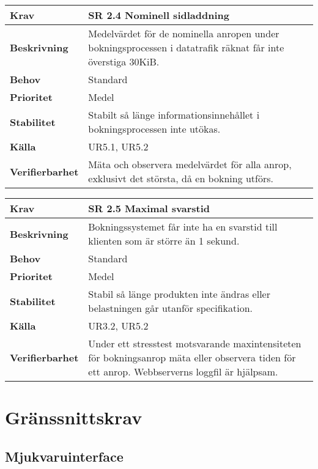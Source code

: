 \documentclass[a4paper, twoside, 11pt, titlepage]{article}
\begin{document}
\begin{tabular} { p{2.6cm} p{12.5cm} }
	\hline
	\sffamily\textbf{Krav} & \sffamily\textbf{SR 2.4 Nominell sidladdning } \\
	\hline
	\sffamily\textbf{Beskrivning} & Medelvärdet för de nominella anropen under bokningsprocessen i datatrafik räknat får inte överstiga 30KiB.  \\
	\hline
	\sffamily\textbf{Behov} & Standard  \\
	\hline
	\sffamily\textbf{Prioritet} & Medel  \\
	\hline
	\sffamily\textbf{Stabilitet} & Stabilt så länge informationsinnehållet i bokningsprocessen inte utökas.  \\
	\hline
	\sffamily\textbf{Källa} & UR5.1, UR5.2  \\
	\hline
	\sffamily\textbf{Verifierbarhet} & Mäta och observera medelvärdet för alla anrop, exklusivt det största, då en bokning utförs.  \\
	\hline
\end{tabular}
\vspace{6mm}

\begin{tabular} { p{2.6cm} p{12.5cm} }
	\hline
	\sffamily\textbf{Krav} & \sffamily\textbf{SR 2.5 Maximal svarstid } \\
	\hline
	\sffamily\textbf{Beskrivning} & Bokningssystemet får inte ha en svarstid till klienten som är större än 1 sekund.  \\
	\hline
	\sffamily\textbf{Behov} & Standard  \\
	\hline
	\sffamily\textbf{Prioritet} & Medel  \\
	\hline
	\sffamily\textbf{Stabilitet} & Stabil så länge produkten inte ändras eller belastningen går utanför specifikation.  \\
	\hline
	\sffamily\textbf{Källa} &  UR3.2, UR5.2  \\
	\hline
	\sffamily\textbf{Verifierbarhet} & Under ett stresstest motsvarande maxintensiteten för bokningsanrop mäta eller observera tiden för ett anrop. Webbserverns loggfil är hjälpsam.  \\
	\hline
\end{tabular}


\clearpage
\section{Gränssnittskrav}



	\subsection{Mjukvaruinterface}
\end{document}
